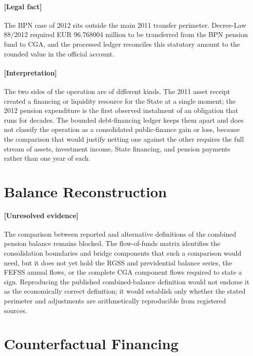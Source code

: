 \documentclass[11pt]{article}
\begin{document}
\paragraph{[Legal fact]}
The BPN case of 2012 sits outside the main 2011 transfer perimeter. Decree-Law 88/2012 required EUR 96.768004 million to be transferred from the BPN pension fund to CGA, and the processed ledger reconciles this statutory amount to the rounded value in the official account.

\paragraph{[Interpretation]}
The two sides of the operation are of different kinds. The 2011 asset receipt created a financing or liquidity resource for the State at a single moment; the 2012 pension expenditure is the first observed instalment of an obligation that runs for decades. The bounded debt-financing ledger keeps them apart and does not classify the operation as a consolidated public-finance gain or loss, because the comparison that would justify netting one against the other requires the full stream of assets, investment income, State financing, and pension payments rather than one year of each.

\section{Balance Reconstruction}
\label{sec:balance}
\paragraph{[Unresolved evidence]}
The comparison between reported and alternative definitions of the combined pension balance remains blocked. The flow-of-funds matrix identifies the consolidation boundaries and bridge components that such a comparison would need, but it does not yet hold the RGSS and previdential balance series, the FEFSS annual flows, or the complete CGA component flows required to state a sign. Reproducing the published combined-balance definition would not endorse it as the economically correct definition; it would establish only whether the stated perimeter and adjustments are arithmetically reproducible from registered sources.

\section{Counterfactual Financing}
\label{sec:counterfactual}
\end{document}
